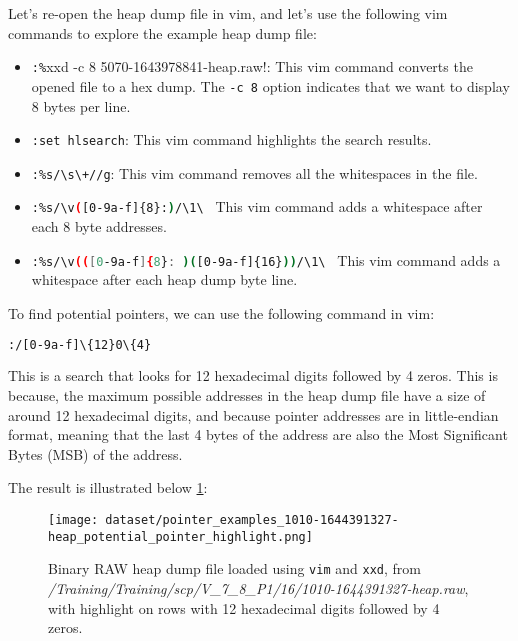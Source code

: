     \begin{minipage}{\dimexpr\linewidth-20pt}
        Let's re-open the heap dump file in vim, and let's use the following vim commands to explore the example heap dump file:

        \begin{itemize} 
            \item \lstinline[language=bash]!:%!xxd -c 8  5070-1643978841-heap.raw!: This vim command converts the opened file to a hex dump. The \lstinline[language=bash]!-c 8! option indicates that we want to display 8 bytes per line.
            \item \lstinline[language=bash]!:set hlsearch!: This vim command highlights the search results.
            \item \lstinline[language=bash]!:%s/\s\+//g!: This vim command removes all the whitespaces in the file.
            \item \lstinline[language=bash]!:%s/\v([0-9a-f]{8}:)/\1\ ! This vim command adds a whitespace after each 8 byte addresses.
            \item \lstinline[language=bash]!:%s/\v(([0-9a-f]{8}: )([0-9a-f]{16}))/\1\ ! This vim command adds a whitespace after each heap dump byte line.
        \end{itemize}
    \end{minipage}

    To find potential pointers, we can use the following command in vim:
    \begin{lstlisting}[language=bash, caption={Vim command to find potential pointers}]
        :/[0-9a-f]\{12}0\{4}
    \end{lstlisting}

    This is a search that looks for 12 hexadecimal digits followed by 4 zeros. This is because, the maximum possible addresses in the heap dump file have a size of around 12 hexadecimal digits, and because pointer addresses are in little-endian format, meaning that the last 4 bytes of the address are also the Most Significant Bytes (MSB) of the address. 
    
    The result is illustrated below \ref{fig:methods:dataset:pointer_examples_1010-1644391327-heap_potential_pointer_highlight}:

    \begin{figure}[H]\label{fig:methods:dataset:pointer_examples_1010-1644391327-heap_potential_pointer_highlight}
        \centering
        \texttt{[image: dataset/pointer\_examples\_1010-1644391327-heap\_potential\_pointer\_highlight.png]}
        \caption{Binary RAW heap dump file loaded using \texttt{vim} and \texttt{xxd}, from \textit{/Training/Training/scp/V\_7\_8\_P1/16/1010-1644391327-heap.raw}, with highlight on rows with 12 hexadecimal digits followed by 4 zeros.}
    \end{figure}

